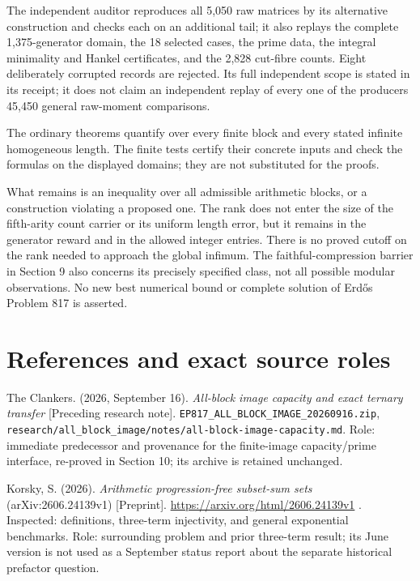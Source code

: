 The independent auditor reproduces all 5,050 raw matrices by its alternative construction and checks each on an additional tail; it also replays the complete 1,375-generator domain, the 18 selected cases, the prime data, the integral minimality and Hankel certificates, and the 2,828 cut-fibre counts. Eight deliberately corrupted records are rejected. Its full independent scope is stated in its receipt; it does not claim an independent replay of every one of the producer\textquotesingle s 45,450 general raw-moment comparisons.

The ordinary theorems quantify over every finite block and every stated infinite homogeneous length. The finite tests certify their concrete inputs and check the formulas on the displayed domains; they are not substituted for the proofs.

What remains is an inequality over all admissible arithmetic blocks, or a construction violating a proposed one. The rank does not enter the size of the fifth-arity count carrier or its uniform length error, but it remains in the generator reward and in the allowed integer entries. There is no proved cutoff on the rank needed to approach the global infimum. The faithful-compression barrier in Section 9 also concerns its precisely specified class, not all possible modular observations. No new best numerical bound or complete solution of Erdős Problem 817 is asserted.

\section{References and exact source roles}\label{n24-references-and-exact-source-roles}

The Clankers. (2026, September 16). \emph{All-block image capacity and exact ternary transfer} {[}Preceding research note{]}. \nolinkurl{EP817_ALL_BLOCK_IMAGE_20260916.zip}, \nolinkurl{research/all_block_image/notes/all-block-image-capacity.md}. Role: immediate predecessor and provenance for the finite-image capacity/prime interface, re-proved in Section 10; its archive is retained unchanged.

Korsky, S. (2026). \emph{Arithmetic progression-free subset-sum sets} (arXiv:2606.24139v1) {[}Preprint{]}. \url{https://arxiv.org/html/2606.24139v1} . Inspected: definitions, three-term injectivity, and general exponential benchmarks. Role: surrounding problem and prior three-term result; its June version is not used as a September status report about the separate historical prefactor question.

